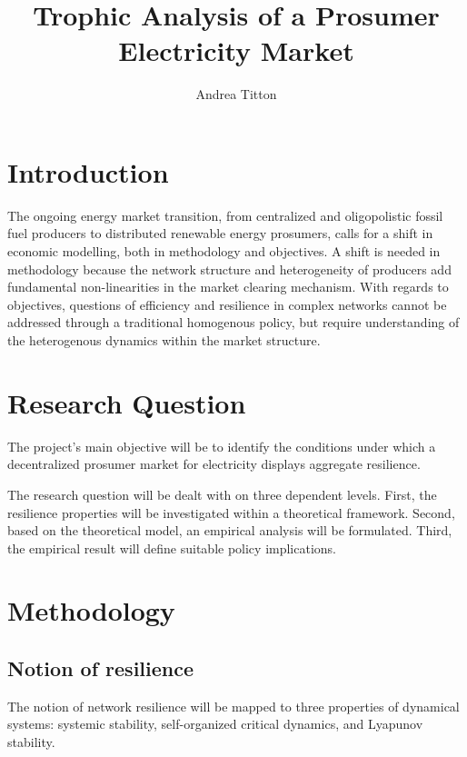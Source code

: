 \documentclass[american]{scrartcl}
\title{
        Trophic Analysis of a Prosumer Electricity Market
    }
\author{Andrea Titton}
\begin{document}
\maketitle

\section{Introduction}



The ongoing energy market transition, from centralized and oligopolistic fossil fuel producers to distributed renewable energy prosumers, calls for a shift in economic modelling, both in methodology and objectives. A shift is needed in methodology because the network structure and heterogeneity of producers add fundamental non-linearities in the market clearing mechanism. With regards to objectives, questions of efficiency and resilience in complex networks cannot be addressed through a traditional homogenous policy, but require understanding of the heterogenous dynamics within the market structure.

\section{Research Question}

The project's main objective will be to identify the conditions under which a decentralized prosumer market for electricity displays aggregate resilience.

The research question will be dealt with on three dependent levels. First, the resilience properties will be investigated within a theoretical framework. Second, based on the theoretical model, an empirical analysis will be formulated. Third, the empirical result will define suitable policy implications.

\section{Methodology}

\subsection{Notion of resilience}

The notion of network resilience will be mapped to three properties of dynamical systems: systemic stability, self-organized critical dynamics, and Lyapunov stability.
\end{document}
